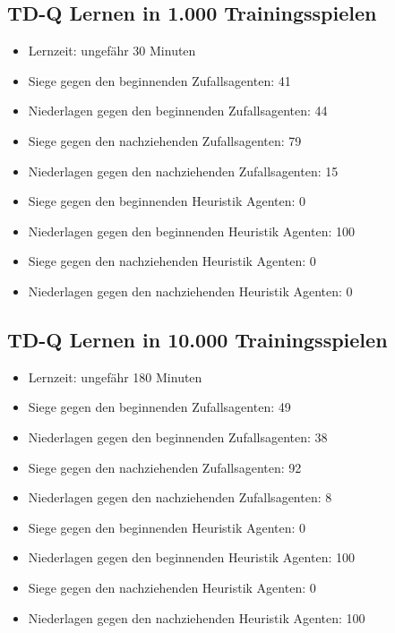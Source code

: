 \subsection{TD-Q Lernen in 1.000 Trainingsspielen}
\begin{itemize}
\item Lernzeit: ungefähr 30 Minuten

\item Siege gegen den beginnenden Zufallsagenten: 41
\item Niederlagen gegen den beginnenden Zufallsagenten: 44

\item Siege gegen den nachziehenden Zufallsagenten: 79
\item Niederlagen gegen den nachziehenden Zufallsagenten: 15

\item Siege gegen den beginnenden Heuristik Agenten: 0
\item Niederlagen gegen den beginnenden Heuristik Agenten: 100

\item Siege gegen den nachziehenden Heuristik Agenten: 0
\item Niederlagen gegen den nachziehenden Heuristik Agenten: 0

\end{itemize}


\subsection{TD-Q Lernen in 10.000 Trainingsspielen}
\begin{itemize}
\item Lernzeit: ungefähr 180 Minuten

\item Siege gegen den beginnenden Zufallsagenten: 49
\item Niederlagen gegen den beginnenden Zufallsagenten: 38

\item Siege gegen den nachziehenden Zufallsagenten: 92
\item Niederlagen gegen den nachziehenden Zufallsagenten: 8

\item Siege gegen den beginnenden Heuristik Agenten: 0
\item Niederlagen gegen den beginnenden Heuristik Agenten: 100 

\item Siege gegen den nachziehenden Heuristik Agenten: 0
\item Niederlagen gegen den nachziehenden Heuristik Agenten: 100 
\end{itemize}
\newpage


